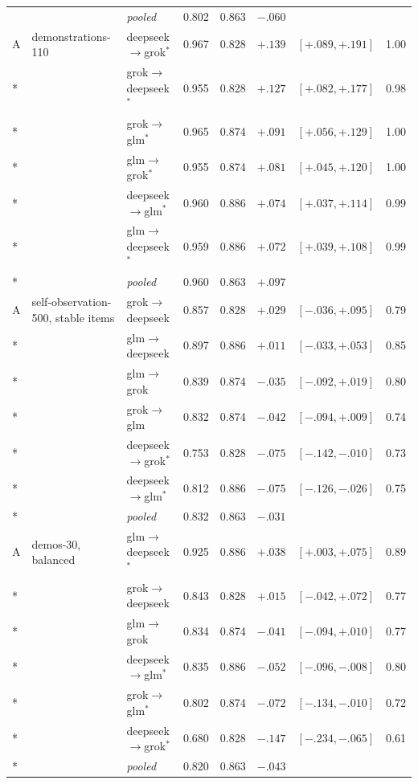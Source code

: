 {\begin{longtable}{lllrlrrr}
 & & \emph{pooled} & 0.802 & 0.863 & $-.060$ & & \\
\addlinespace
A & demonstrations-110 & deepseek$\to$grok$^{*}$ & 0.967 & 0.828 & $+.139$ & $[+.089,+.191]$ & 1.00 \\*
 &  & grok$\to$deepseek$^{*}$ & 0.955 & 0.828 & $+.127$ & $[+.082,+.177]$ & 0.98 \\*
 &  & grok$\to$glm$^{*}$ & 0.965 & 0.874 & $+.091$ & $[+.056,+.129]$ & 1.00 \\*
 &  & glm$\to$grok$^{*}$ & 0.955 & 0.874 & $+.081$ & $[+.045,+.120]$ & 1.00 \\*
 &  & deepseek$\to$glm$^{*}$ & 0.960 & 0.886 & $+.074$ & $[+.037,+.114]$ & 0.99 \\*
 &  & glm$\to$deepseek$^{*}$ & 0.959 & 0.886 & $+.072$ & $[+.039,+.108]$ & 0.99 \\*
 & & \emph{pooled} & 0.960 & 0.863 & $+.097$ & & \\
\addlinespace
A & self-observation-500, stable items & grok$\to$deepseek & 0.857 & 0.828 & $+.029$ & $[-.036,+.095]$ & 0.79 \\*
 &  & glm$\to$deepseek & 0.897 & 0.886 & $+.011$ & $[-.033,+.053]$ & 0.85 \\*
 &  & glm$\to$grok & 0.839 & 0.874 & $-.035$ & $[-.092,+.019]$ & 0.80 \\*
 &  & grok$\to$glm & 0.832 & 0.874 & $-.042$ & $[-.094,+.009]$ & 0.74 \\*
 &  & deepseek$\to$grok$^{*}$ & 0.753 & 0.828 & $-.075$ & $[-.142,-.010]$ & 0.73 \\*
 &  & deepseek$\to$glm$^{*}$ & 0.812 & 0.886 & $-.075$ & $[-.126,-.026]$ & 0.75 \\*
 & & \emph{pooled} & 0.832 & 0.863 & $-.031$ & & \\
\addlinespace
A & demos-30, balanced & glm$\to$deepseek$^{*}$ & 0.925 & 0.886 & $+.038$ & $[+.003,+.075]$ & 0.89 \\*
 &  & grok$\to$deepseek & 0.843 & 0.828 & $+.015$ & $[-.042,+.072]$ & 0.77 \\*
 &  & glm$\to$grok & 0.834 & 0.874 & $-.041$ & $[-.094,+.010]$ & 0.77 \\*
 &  & deepseek$\to$glm$^{*}$ & 0.835 & 0.886 & $-.052$ & $[-.096,-.008]$ & 0.80 \\*
 &  & grok$\to$glm$^{*}$ & 0.802 & 0.874 & $-.072$ & $[-.134,-.010]$ & 0.72 \\*
 &  & deepseek$\to$grok$^{*}$ & 0.680 & 0.828 & $-.147$ & $[-.234,-.065]$ & 0.61 \\*
 & & \emph{pooled} & 0.820 & 0.863 & $-.043$ & & \\

\end{longtable}}
